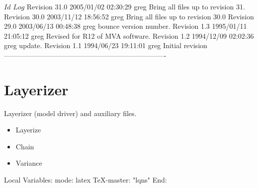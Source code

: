 \C 
\C $Id$
\C 
\C $Log$
\C Revision 31.0  2005/01/02 02:30:29  greg
\C Bring all files up to revision 31.
\C
\C Revision 30.0  2003/11/12 18:56:52  greg
\C Bring all files up to revision 30.0
\C
\C Revision 29.0  2003/06/13 00:48:38  greg
\C bounce version number.
\C
\C Revision 1.3  1995/01/11 21:05:12  greg
\C Revised for R12 of MVA software.
\C
\C Revision 1.2  1994/12/09  02:02:36  greg
\C update.
\C
\C Revision 1.1  1994/06/23  19:11:01  greg
\C Initial revision
\C
\C ----------------------------------------------------------------------
\chapter{Layerizer}

Layerizer (model driver) and auxiliary files.

\begin{iftex}
\begin{itemize}
\item Layerize
\item Chain
\item Variance
\end{itemize}
\end{iftex}




\C Local Variables: 
\C mode: latex
\C TeX-master: "lqns"
\C End: 
